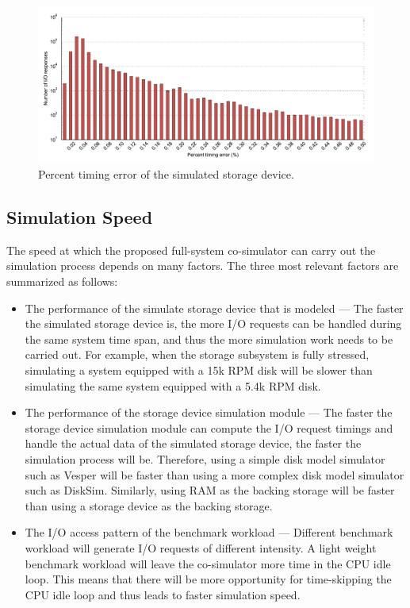 \begin{figure}[htpb]
	\centering
	\includegraphics[width=\textwidth]{figures/ch5-fig-15b.pdf}
	\caption{\label{fig:ch5-fig-15b}Percent timing error of the simulated storage device.}
\end{figure}


\subsection{Simulation Speed}
\label{sec:simulation-performance}

The speed at which the proposed full-system co-simulator can carry out the simulation process depends on many factors. The three most relevant factors are summarized as follows:

\begin{itemize}
	\item The performance of the simulate storage device that is modeled --- The faster the simulated storage device is, the more I/O requests can be handled during the same system time span, and thus the more simulation work needs to be carried out. For example, when the storage subsystem is fully stressed, simulating a system equipped with a 15k RPM disk will be slower than simulating the same system equipped with a 5.4k RPM disk.
	
	\item The performance of the storage device simulation module --- The faster the storage device simulation module can compute the I/O request timings and handle the actual data of the simulated storage device, the faster the simulation process will be. Therefore, using a simple disk model simulator such as Vesper will be faster than using a more complex disk model simulator such as DiskSim. Similarly, using RAM as the backing storage will be faster than using a storage device as the backing storage.
	
	\item The I/O access pattern of the benchmark workload --- Different benchmark workload will generate I/O requests of different intensity. A light weight benchmark workload will leave the co-simulator more time in the CPU idle loop. This means that there will be more opportunity for time-skipping the CPU idle loop and thus leads to faster simulation speed.
\end{itemize}

